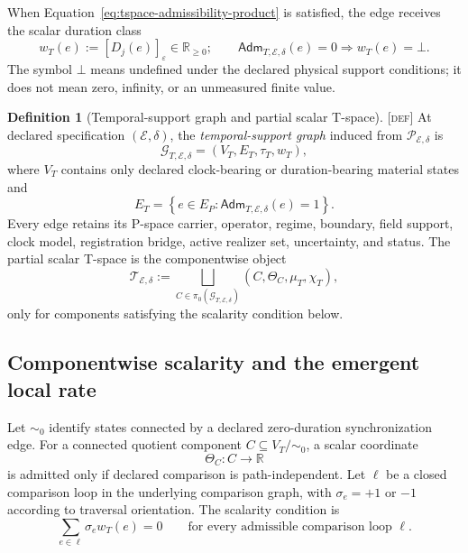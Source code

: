 \documentclass[11pt]{article}
\newcommand{\Pspace}{\ensuremath{\mathcal{P}}}
\newcommand{\Tspace}{\ensuremath{\mathcal{T}}}
\newcommand{\Defn}{\textsc{[def]}}
\theoremstyle{definition}
\newtheorem{sdefinition}{Definition}
\begin{document}
When Equation~\eqref{eq:tspace-admissibility-product} is satisfied, the edge
receives the scalar duration class
\begin{equation}
w_T(e):=[D_j(e)]_{\varepsilon}\in\mathbb R_{\geq0};
\qquad
\mathsf{Adm}_{T,\mathcal E,\delta}(e)=0
\Longrightarrow
w_T(e)=\bot.
\label{eq:tspace-edge-duration}
\end{equation}
The symbol $\bot$ means undefined under the declared physical support conditions;
it does not mean zero, infinity, or an unmeasured finite value.

\begin{sdefinition}[Temporal-support graph and partial scalar T-space]
\label{def:tspace}
\Defn{} At declared specification $(\mathcal E,\delta)$, the \emph{temporal-support
graph} induced from $\Pspace_{\mathcal E,\delta}$ is
\begin{equation}
\mathcal G_{T,\mathcal E,\delta}
=(V_T,E_T,\tau_T,w_T),
\label{eq:tspace-support-graph}
\end{equation}
where $V_T$ contains only declared clock-bearing or duration-bearing material
states and
\begin{equation}
E_T=
\left\{e\in E_P:\mathsf{Adm}_{T,\mathcal E,\delta}(e)=1\right\}.
\label{eq:tspace-edges}
\end{equation}
Every edge retains its P-space carrier, operator, regime, boundary, field support,
clock model, registration bridge, active realizer set, uncertainty, and status.
The partial scalar T-space is the componentwise object
\begin{equation}
\Tspace_{\mathcal E,\delta}
:=
\bigsqcup_{C\in\pi_0(\mathcal G_{T,\mathcal E,\delta})}
\left(C,\Theta_C,\mu_T,\chi_T\right),
\label{eq:tspace-componentwise-object}
\end{equation}
only for components satisfying the scalarity condition below.
\end{sdefinition}

\subsection{Componentwise scalarity and the emergent local rate}
\label{supp:tspace-scalarity}

Let $\sim_0$ identify states connected by a declared zero-duration
synchronization edge. For a connected quotient component
$C\subseteq V_T/\sim_0$, a scalar coordinate
\begin{equation}
\Theta_C:C\longrightarrow\mathbb R
\label{eq:tspace-component-coordinate}
\end{equation}
is admitted only if declared comparison is path-independent.  Let $\ell$ be a
closed comparison loop in the underlying comparison graph, with $\sigma_e=+1$ or
$-1$ according to traversal orientation. The scalarity condition is
\begin{equation}
\sum_{e\in\ell}\sigma_e w_T(e)=0
\qquad
\text{for every admissible comparison loop }\ell.
\label{eq:tspace-integrability}
\end{equation}
\end{document}
